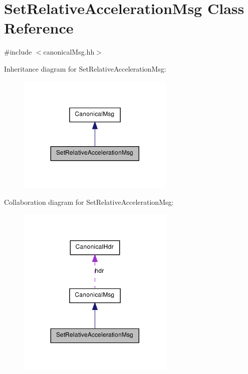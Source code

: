 \hypertarget{class_set_relative_acceleration_msg}{
\section{SetRelativeAccelerationMsg Class Reference}
\label{class_set_relative_acceleration_msg}
}


{\ttfamily \#include $<$canonicalMsg.hh$>$}



Inheritance diagram for SetRelativeAccelerationMsg:\nopagebreak
\begin{figure}[H]
\begin{center}
\leavevmode
\includegraphics[width=212pt]{class_set_relative_acceleration_msg__inherit__graph}
\end{center}
\end{figure}


Collaboration diagram for SetRelativeAccelerationMsg:\nopagebreak
\begin{figure}[H]
\begin{center}
\leavevmode
\includegraphics[width=212pt]{class_set_relative_acceleration_msg__coll__graph}
\end{center}
\end{figure}
